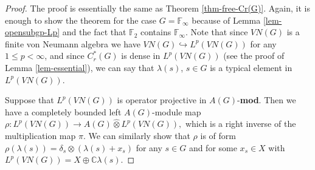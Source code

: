 \documentclass[10pt]{amsart}
\numberwithin{thm}{section}
\numberwithin{equation}{section}
\begin{document}
\begin{proof}
The proof is essentially the same as Theorem \ref{thm-free-Cr(G)}.
Again, it is enough to show the theorem for the case $G = \mathbb{F}_\infty$
because of Lemma \ref{lem-opensubgp-Lp} and the fact that $\mathbb{F}_2$ contains $\mathbb{F}_\infty$.
Note that since $VN(G)$ is a finite von Neumann algebra we have $VN(G) \hookrightarrow L^p(VN(G))$ for any $1\le p<\infty$,
and since $C^*_r(G)$ is dense in $L^p(VN(G))$ (see the proof of Lemma \ref{lem-essential}),
we can say that $\lambda(s)$, $s\in G$ is a typical element in $L^p(VN(G))$.

Suppose that $L^p(VN(G))$ is operator projective in $A(G)$-{\bf mod}. Then we have a completely bounded left $A(G)$-module map
	$\rho : L^p(VN(G)) \rightarrow A(G) {\widehat{\otimes}} L^p(VN(G)),$
which is a right inverse of the multiplication map $\pi$. We can similarly show that $\rho$ is of form
$\rho(\lambda(s)) = \delta_s \otimes (\lambda(s) + x_s)$
for any $s\in G$ and for some $x_s \in X$ with $L^p(VN(G)) = X \oplus \mathbb{C}\lambda(s)$.


\end{proof}
\end{document}
